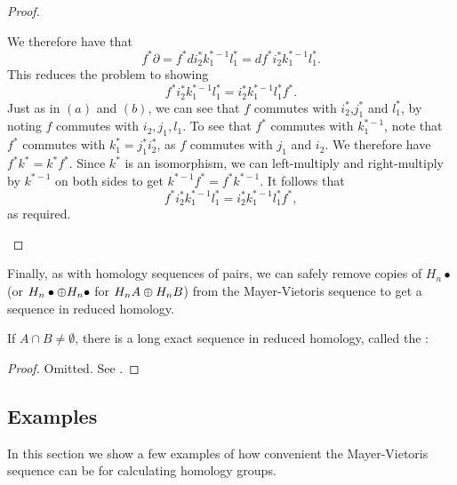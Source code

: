 \begin{proof}
\begin{enumerate}[(a)]
We therefore have that $$f^*\partial=f^*di^*_2k_1^{*-1}l_1^*=df^*i^*_2k_1^{*-1}l_1^*.$$
This reduces the problem to showing 
$$f^*i^*_2k_1^{*-1}l_1^*=i^*_2k_1^{*-1}l_1^*f^*.$$
Just as in $(a)$ and $(b)$, we can see that $f$ commutes with $i^*_2$,$j_1^*$ and $l_1^*$, by noting $f$ commutes with $i_2,j_1,l_1$. To see that $f^*$ commutes with $k_1^{*-1}$, note that $f^*$ commutes with $k_1^*=j_1^*i_2^*$, as $f$ commutes with $j_1$ and $i_2$. We therefore have $f^*k^*=k^*f^*$. Since $k^*$ is an isomorphism, we can left-multiply and right-multiply by $k^{*-1}$ on both sides to get
$k^{*-1}f^*=f^*k^{*-1}.$ It follows that $$f^*i^*_2k_1^{*-1}l_1^*=i^*_2k_1^{*-1}l_1^*f^*,$$ as required.
\end{enumerate}
\end{proof}

Finally, as with homology sequences of pairs, we can safely remove copies of $H_n\bullet$ (or $H_n\bullet\oplus H_n\bullet$ for $H_nA\oplus H_n B$) from the Mayer-Vietoris sequence to get a sequence in reduced homology.

\begin{prop}
If $A\cap B\neq \emptyset$, there is a long exact sequence in reduced homology, called the : 

\end{prop}

\begin{proof}
Omitted. See \cite{Spanier}.
\end{proof}

\subsection{Examples}
In this section we show a few examples of how convenient the Mayer-Vietoris sequence can be for calculating homology groups.

